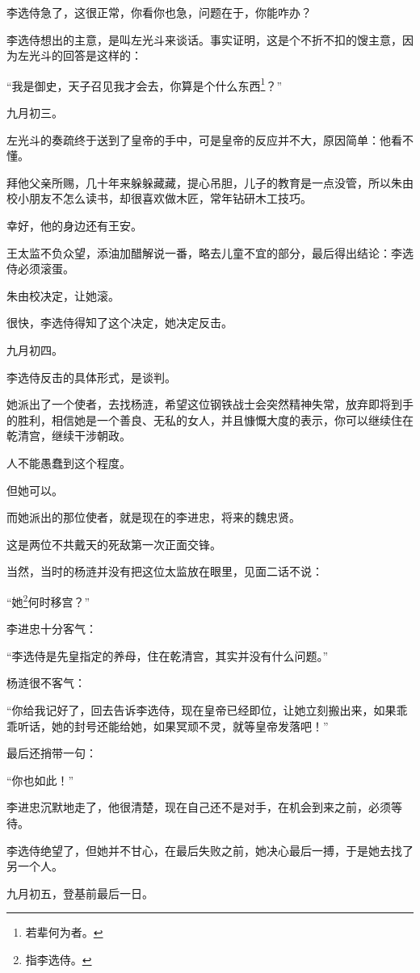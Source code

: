 \begin{multicols}{\theparacolNo}
李选侍急了，这很正常，你看你也急，问题在于，你能咋办？

李选侍想出的主意，是叫左光斗来谈话。事实证明，这是个不折不扣的馊主意，因为左光斗的回答是这样的：

“我是御史，天子召见我才会去，你算是个什么东西\footnote{若辈何为者。}？”

九月初三。

左光斗的奏疏终于送到了皇帝的手中，可是皇帝的反应并不大，原因简单：他看不懂。

拜他父亲所赐，几十年来躲躲藏藏，提心吊胆，儿子的教育是一点没管，所以朱由校小朋友不怎么读书，却很喜欢做木匠，常年钻研木工技巧。

幸好，他的身边还有王安。

王太监不负众望，添油加醋解说一番，略去儿童不宜的部分，最后得出结论：李选侍必须滚蛋。

朱由校决定，让她滚。

很快，李选侍得知了这个决定，她决定反击。

九月初四。

李选侍反击的具体形式，是谈判。

她派出了一个使者，去找杨涟，希望这位钢铁战士会突然精神失常，放弃即将到手的胜利，相信她是一个善良、无私的女人，并且慷慨大度的表示，你可以继续住在乾清宫，继续干涉朝政。

人不能愚蠢到这个程度。

但她可以。

而她派出的那位使者，就是现在的李进忠，将来的魏忠贤。

这是两位不共戴天的死敌第一次正面交锋。

当然，当时的杨涟并没有把这位太监放在眼里，见面二话不说：

“她\footnote{指李选侍。}何时移宫？”

李进忠十分客气：

“李选侍是先皇指定的养母，住在乾清宫，其实并没有什么问题。”

杨涟很不客气：

“你给我记好了，回去告诉李选侍，现在皇帝已经即位，让她立刻搬出来，如果乖乖听话，她的封号还能给她，如果冥顽不灵，就等皇帝发落吧！”

最后还捎带一句：

“你也如此！”

李进忠沉默地走了，他很清楚，现在自己还不是对手，在机会到来之前，必须等待。

李选侍绝望了，但她并不甘心，在最后失败之前，她决心最后一搏，于是她去找了另一个人。

九月初五，登基前最后一日。


\end{multicols}
